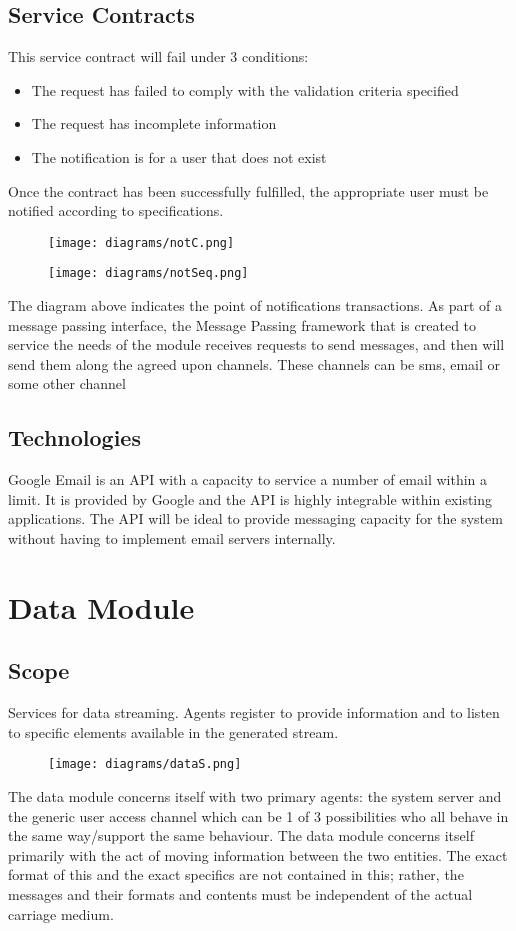 \documentclass[12pt]{article}
\begin{document}
\subsection{Service Contracts}
This service contract will fail under 3 conditions:
\begin{itemize}
\item The request has failed to comply with the validation criteria specified
\item The request has incomplete information
\item The notification is for a user that does not exist
\end{itemize}
Once the contract has been successfully fulfilled, the appropriate user must be notified according to specifications.
\begin{figure}
\centering
\texttt{[image: diagrams/notC.png]}
\end{figure}

\begin{figure}
\centering
\texttt{[image: diagrams/notSeq.png]}
\end{figure}
The diagram above indicates the point of notifications transactions. As part of a message passing interface, the Message Passing framework that is created to service the needs of the module receives requests to send messages, and then will send them along the agreed upon channels. These channels can be sms, email or some other channel
\subsection{Technologies}
Google Email is an API with a capacity to service a number of email within a limit. It is provided by Google and the API is highly integrable within existing applications. The API will be ideal to provide messaging capacity for the system without having to implement email servers internally.

\section{Data Module}
\subsection{Scope}
Services for data streaming. Agents register to provide information and to listen to specific elements available in the generated stream.

\begin{figure}[h]
\centering
\texttt{[image: diagrams/dataS.png]}
\end{figure}
The data module concerns itself with two primary agents: the system server and the generic user access channel which can be 1 of 3 possibilities who all behave in the same way/support the same behaviour. The data module concerns itself primarily with the act of moving information between the two entities. The exact format of this and the exact specifics are not contained in this; rather, the messages and their formats and contents must be independent of the actual carriage medium. 
\end{document}

